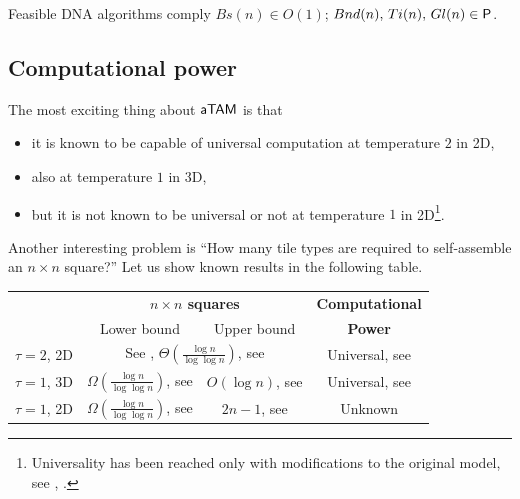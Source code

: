 	\begin{thesis}
	\label{ths:feasible}
		Feasible DNA algorithms comply $Bs(n)\in O(1)$; $Bnd(n),\,Ti(n),\,Gl(n)\in \P$.
	\end{thesis}


\subsection{Computational power}\label{sec:wang_power}
	
	The most exciting thing about $\atam$ is that
	\begin{itemize}
		\item it is known to be capable of universal computation at temperature $2$ in 2D,
		\item also at temperature $1$ in 3D,
		\item but it is not known to be universal or not at temperature $1$ in 2D\footnote{Universality has been reached only with modifications to the original model, see \cite{stage_assembly}, \cite{active_tiles}.}.
	\end{itemize}
	Another interesting problem is ``How many tile types are required to self-assemble an $n\times n$ square?'' Let us show known results in the following table.
	
	\begin{center}
	\begin{tabular}{|| c || c | c | c ||}
		\hline\hline
		~ & \multicolumn{2}{c|}{\bf $n\times n$ squares} & {\bf Computational} \\
		~ & \multicolumn{1}{c}{Lower bound} & \multicolumn{1}{c|}{Upper bound} & {\bf Power}\\
		\hline
		$\tau=2$, 2D & \multicolumn{2}{c|}{See \cite{square_lb}, $\Theta(\frac{\log n}{\log\log n})$, see \cite{square_ub}} & Universal, see \cite{winfree_phd} \\
		\hline
		$\tau=1$, 3D & $\Omega(\frac{\log n}{\log\log n})$, see \cite{square_lb} & $O(\log n)$, see \cite{cook_temp1} & Universal, see \cite{cook_temp1} \\
		\hline
		$\tau=1$, 2D & $\Omega(\frac{\log n}{\log\log n})$, see \cite{square_lb} & $2n-1$, see \cite{square_lb} & Unknown \\
		\hline\hline
	\end{tabular}
	\end{center}


